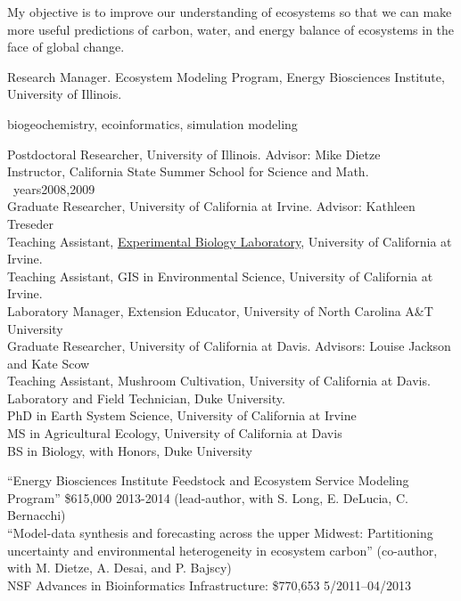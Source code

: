 \documentclass{xetexCV}
\begin{document}
\makecvtitle


My objective is to improve our understanding of ecosystems so that we can make more useful predictions of carbon, water, and energy balance of ecosystems in the face of global change.

Research Manager. Ecosystem Modeling Program, Energy Biosciences Institute, University of Illinois.

biogeochemistry, ecoinformatics, simulation modeling

Postdoctoral Researcher, University of Illinois. Advisor: Mike Dietze  \\
Instructor, California State Summer School for Science and Math. \ years{2008,2009}\\
Graduate Researcher, University of California at Irvine. Advisor: Kathleen Treseder  \\
Teaching Assistant,  \href{https://sites.google.com/site/bio100lwlab14/}{Experimental Biology Laboratory}, University of California at Irvine.  \\
Teaching Assistant, GIS in Environmental Science, University of California at Irvine.  \\
Laboratory Manager, Extension Educator, University of North Carolina A\&T University   \\
Graduate Researcher, University of California at Davis. Advisors: Louise Jackson and Kate Scow  \\
Teaching Assistant, Mushroom Cultivation, University of California at Davis.  \\
Laboratory and Field Technician, Duke University.  \\

PhD in Earth System Science, University of California at Irvine  \\
MS in Agricultural Ecology, University of California at Davis  \\
BS in Biology, with Honors, Duke University 


``Energy Biosciences Institute Feedstock and Ecosystem Service Modeling Program'' \$615,000 2013-2014 (lead-author, with S. Long, E. DeLucia, C. Bernacchi)\\
\vspace{1}
``Model-data synthesis and forecasting across the upper Midwest: Partitioning uncertainty and environmental heterogeneity in ecosystem carbon''   (co-author, with M. Dietze, A. Desai, and P. Bajscy) \\
NSF Advances in Bioinformatics Infrastructure: \$770,653 5/2011--04/2013\\
\end{document}
